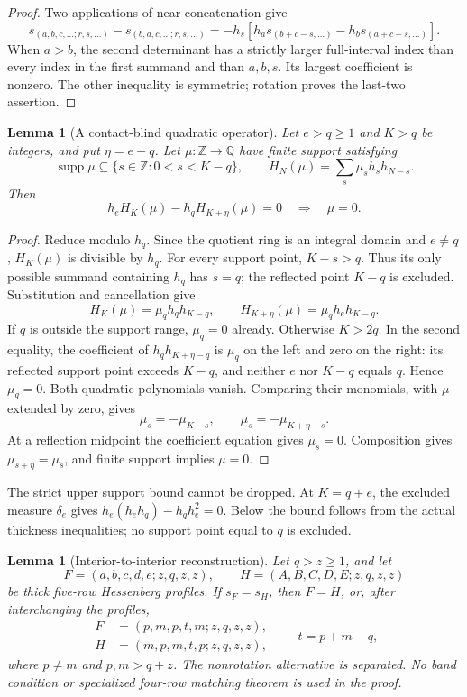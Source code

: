 \documentclass[11pt,a4paper]{amsart}
\numberwithin{equation}{section}
\theoremstyle{plain}
\newtheorem{lemma}[theorem]{Lemma}
\theoremstyle{definition}
\newcommand{\Q}{\mathbb Q}
\newcommand{\Z}{\mathbb Z}
\begin{document}
\begin{proof}
Two applications of near-concatenation give
\[
 s_{(a,b,c,\ldots;r,s,\ldots)}-s_{(b,a,c,\ldots;r,s,\ldots)}
 =-h_s\left[h_as_{(b+c-s,\ldots)}-h_bs_{(a+c-s,\ldots)}\right].
\]
When \(a>b\), the second determinant has a strictly larger full-interval
index than every index in the first summand and than \(a,b,s\).
Its largest coefficient is nonzero.  The other inequality is symmetric;
rotation proves the last-two assertion.
\end{proof}

\begin{lemma}[A contact-blind quadratic operator]
\label{lem:staircase-quadratic-injectivity}
Let \(e>q\ge1\) and \(K>q\) be integers, and put \(\eta=e-q\).
Let \(\mu:\Z\longrightarrow\Q\) have finite support satisfying
\[
 \operatorname{supp}\mu\subseteq\{s\in\Z:0<s<K-q\},\qquad
 H_N(\mu)=\sum_s\mu_s h_sh_{N-s}.
\]
Then
\[
 h_eH_K(\mu)-h_qH_{K+\eta}(\mu)=0
 \quad\Longrightarrow\quad\mu=0.
\]
\end{lemma}

\begin{proof}
Reduce modulo \(h_q\).  Since the quotient ring is an integral domain
and \(e\ne q\), \(H_K(\mu)\) is divisible by \(h_q\).
For every support point, \(K-s>q\).  Thus its only possible summand
containing \(h_q\) has \(s=q\); the reflected point \(K-q\)
is excluded.  Substitution and cancellation give
\[
 H_K(\mu)=\mu_qh_qh_{K-q},\qquad
 H_{K+\eta}(\mu)=\mu_qh_eh_{K-q}.
\]
If \(q\) is outside the support range, \(\mu_q=0\) already.
Otherwise \(K>2q\).  In the second equality, the coefficient of
\(h_qh_{K+\eta-q}\) is \(\mu_q\) on the left and zero on the
right: its reflected support point exceeds \(K-q\), and neither
\(e\) nor \(K-q\) equals \(q\).  Hence \(\mu_q=0\).
Both quadratic polynomials vanish.  Comparing their monomials, with
\(\mu\) extended by zero, gives
\[
 \mu_s=-\mu_{K-s},\qquad \mu_s=-\mu_{K+\eta-s}.
\]
At a reflection midpoint the coefficient equation gives \(\mu_s=0\).
Composition gives \(\mu_{s+\eta}=\mu_s\), and finite support implies
\(\mu=0\).
\end{proof}

The strict upper support bound cannot be dropped.  At \(K=q+e\),
the excluded measure \(\delta_e\) gives
\(h_e(h_eh_q)-h_qh_e^2=0\).  Below the bound follows from the
actual thickness inequalities; no support point equal to \(q\)
is excluded.

\begin{lemma}[Interior-to-interior reconstruction]
\label{lem:staircase-interior}
Let \(q>z\ge1\), and let
\[
 F=(a,b,c,d,e;z,q,z,z),\qquad
 H=(A,B,C,D,E;z,q,z,z)
\]
be thick five-row Hessenberg profiles.  If \(s_F=s_H\), then \(F=H\),
or, after interchanging the profiles,
\[
 \begin{aligned}
 F&=(p,m,p,t,m;z,q,z,z),\\
 H&=(m,p,m,t,p;z,q,z,z),
 \end{aligned}
 \qquad t=p+m-q,
\]
where \(p\ne m\) and \(p,m>q+z\).  The nonrotation alternative is
separated.  No band condition or specialized four-row matching theorem
is used in the proof.
\end{lemma}
\end{document}
